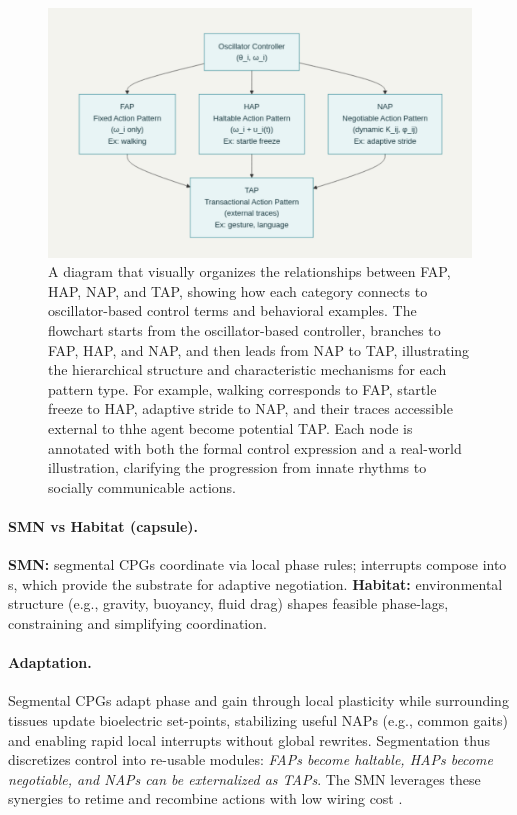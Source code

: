 \begin{figure}[ht] 
\includegraphics[width=\textwidth]{graphics/FAP-HAP-NAP-TAP-2.pdf}
\caption{A diagram that visually organizes the relationships between FAP, HAP, NAP, and TAP, showing how each category connects to oscillator-based control terms and behavioral examples. The flowchart starts from the oscillator-based controller, branches to FAP, HAP, and NAP, and then leads from NAP to TAP, illustrating the hierarchical structure and characteristic mechanisms for each pattern type. For example, walking corresponds to FAP, startle freeze to HAP, adaptive stride to NAP, and their traces accessible external to thhe agent become potential TAP. Each node is annotated with both the formal control expression and a real-world illustration, clarifying the progression from innate rhythms to socially communicable actions.}\label{schematic-fhnt-ap}
\end{figure}

\paragraph{SMN vs Habitat (capsule).}
\textbf{SMN:} segmental CPGs coordinate via local phase rules; interrupts compose into \NAP{}s, which provide the substrate for adaptive negotiation.  
\textbf{Habitat:} environmental structure (e.g., gravity, buoyancy, fluid drag) shapes feasible phase-lags, constraining and simplifying coordination.  

\paragraph{Adaptation.}
Segmental CPGs adapt phase and gain through local plasticity while surrounding tissues update bioelectric set-points, stabilizing useful NAPs (e.g., common gaits) and enabling rapid local interrupts without global rewrites.  
Segmentation thus discretizes control into re-usable modules: \emph{FAPs become haltable, HAPs become negotiable, and NAPs can be externalized as TAPs}.  
The SMN leverages these synergies to retime and recombine actions with low wiring cost \citep{BizziCheung2013}.


